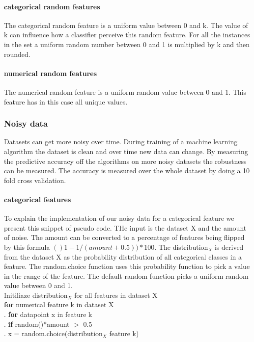 \documentclass[a4paper,10pt]{article}
\begin{document}
\paragraph{categorical random features \newline}
The categorical random feature is a uniform value between 0 and k. The value of k can influence how a classifier perceive this random feature. For all the instances in the set a uniform random number between 0 and 1 is multiplied by k and then rounded. 
\paragraph{numerical random features \newline}
The numerical random feature is a uniform random value between 0 and 1. This feature has in this case all unique values.


\subsubsection{Noisy data}
Datasets can get more noisy over time. During training of a machine learning algorithm the dataset is clean and over time new data can change. By measuring the predictive accuracy off the algorithms on more noisy datasets the robustness can be measured. The accuracy is measured over the whole dataset by doing a 10 fold cross validation.

\paragraph{categorical features \newline}
To explain the implementation of our noisy data for a categorical feature we present this snippet of pseudo code. THe input is the dataset X and the amount of noise. The amount can be converted to a percentage of features being flipped by this formula $()1-1/(amount+0.5))*100$. The distribution$_X$ is derived from the dataset X as the probability distribution of all categorical classes in a feature. The random.choice function uses this probability function to pick a value in the range of the feature. The default random function picks a uniform random value between 0 and 1.  \\
Initiliaze distribution$_X$ for all features in dataset X\\
\textbf{for} numerical feature k in dataset X\\
.\hspace{1cm} \textbf{for} datapoint x in feature k\\
.\hspace{2cm} \textbf{if} random()*amount $>$ 0.5 \\	
.\hspace{3cm} x = random.choice(distribution$_X$ feature k) 
\\
\end{document}
